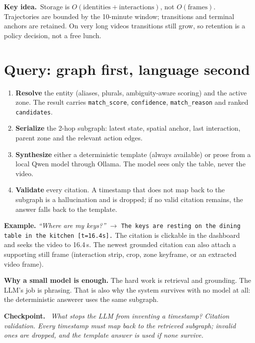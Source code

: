 \documentclass[10pt,a4paper]{article}
\newcommand{\code}[1]{\texttt{\small #1}}
\newcommand{\panel}[1]{%
  \noindent\colorbox{panel}{%
    \begin{minipage}{\dimexpr\linewidth-2\fboxsep\relax}
    \vspace{2pt}#1\vspace{2pt}
    \end{minipage}}%
}
\newcommand{\keyidea}[1]{%
  \par\medskip\noindent\colorbox{panel}{%
    \begin{minipage}{\dimexpr\linewidth-2\fboxsep\relax}
    \vspace{2pt}\textbf{\textcolor{accent}{Key idea.}}\ #1\vspace{2pt}
    \end{minipage}}\par\medskip
}
\newenvironment{checkpoint}
  {\par\medskip\noindent\colorbox{accent!5}\bgroup
     \begin{minipage}{\dimexpr\linewidth-2\fboxsep\relax}
     \vspace{3pt}\textbf{\textcolor{accent}{Checkpoint.}}\ \itshape}
  {\vspace{3pt}\end{minipage}\egroup\par\medskip}
\begin{document}
\keyidea{Storage is \(O(\text{identities} + \text{interactions})\), not \(O(\text{frames})\).
Trajectories are bounded by the 10-minute window; transitions and terminal anchors are retained.
On very long videos transitions still grow, so retention is a policy decision, not a free lunch.}

\section{Query: graph first, language second}

\begin{enumerate}[leftmargin=1.25em,itemsep=1pt]
  \item \textbf{Resolve} the entity (aliases, plurals, ambiguity-aware scoring) and the active zone.
        The result carries \code{match\_score}, \code{confidence}, \code{match\_reason} and ranked
        \code{candidates}.
  \item \textbf{Serialize} the 2-hop subgraph: latest state, spatial anchor, last interaction,
        parent zone and the relevant action edges.
  \item \textbf{Synthesize} either a deterministic template (always available) or prose from a local
        Qwen model through Ollama. The model sees only the table, never the video.
  \item \textbf{Validate} every citation. A timestamp that does not map back to the subgraph is a
        hallucination and is dropped; if no valid citation remains, the answer falls back to the
        template.
\end{enumerate}

\panel{
\textbf{Example.} \emph{``Where are my keys?''} \(\rightarrow\)
\texttt{The keys are resting on the dining table in the kitchen [t=16.4s].}
The citation is clickable in the dashboard and seeks the video to 16.4\,s. The newest grounded
citation can also attach a supporting still frame (interaction strip, crop, zone keyframe, or an
extracted video frame).
}

\noindent
\textbf{Why a small model is enough.} The hard work is retrieval and grounding. The LLM's job is
phrasing. That is also why the system survives with no model at all: the deterministic answerer uses
the same subgraph.

\begin{checkpoint}
What stops the LLM from inventing a timestamp? \emph{Citation validation. Every timestamp must map
back to the retrieved subgraph; invalid ones are dropped, and the template answer is used if none
survive.}
\end{checkpoint}
\end{document}
